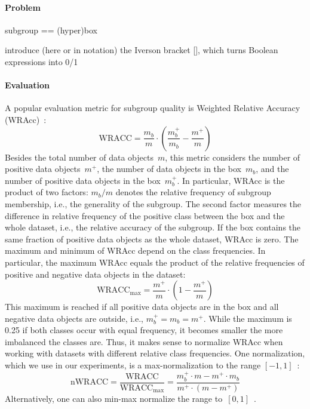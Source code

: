 \documentclass{article}
\theoremstyle{definition}
\begin{document}
\paragraph{Problem}

subgroup == (hyper)box

introduce (here or in notation) the Iverson bracket [], which turns Boolean expressions into 0/1

\paragraph{Evaluation}

A popular evaluation metric for subgroup quality is Weighted Relative Accuracy (WRAcc)~\cite{lavravc1999rule}:
%
\begin{equation}
	\text{WRACC} = \frac{m_b}{m} \cdot \left( \frac{m_b^+}{m_b} - \frac{m^+}{m} \right)
	\label{eq:csd:wracc}
\end{equation}
%
Besides the total number of data objects~$m$, this metric considers the number of positive data objects~$m^+$, the number of data objects in the box~$m_b$, and the number of positive data objects in the box~$m_b^+$.
In particular, WRAcc is the product of two factors:
$m_b / m$ denotes the relative frequency of subgroup membership, i.e., the generality of the subgroup.
The second factor measures the difference in relative frequency of the positive class between the box and the whole dataset, i.e., the relative accuracy of the subgroup.
If the box contains the same fraction of positive data objects as the whole dataset, WRAcc is zero.
The maximum and minimum of WRAcc depend on the class frequencies.
In particular, the maximum WRAcc equals the product of the relative frequencies of positive and negative data objects in the dataset:
%
\begin{equation}
	\text{WRACC}_{\text{max}} = \frac{m^+}{m} \cdot \left( 1 - \frac{m^+}{m} \right)
	\label{eq:csd:wracc-max}
\end{equation}
%
This maximum is reached if all positive data objects are in the box and all negative data objects are outside, i.e., $m_b^+ = m_b = m^+$.
While the maximum is 0.25 if both classes occur with equal frequency, it becomes smaller the more imbalanced the classes are.
Thus, it makes sense to normalize WRAcc when working with datasets with different relative class frequencies.
One normalization, which we use in our experiments, is a max-normalization to the range $[-1, 1]$~\cite{mathonat2021anytime}:
%
\begin{equation}
	\text{nWRACC} = \frac{\text{WRACC}}{\text{WRACC}_{\text{max}}} = \frac{m_b^+ \cdot m - m^+ \cdot m_b}{m^+ \cdot (m - m^+)}
	\label{eq:csd:wracc-normalized}
\end{equation}
%
Alternatively, one can also min-max normalize the range to~$[0, 1]$~\cite{carmona2018unifying, ventura2018subgroup}.
\end{document}
